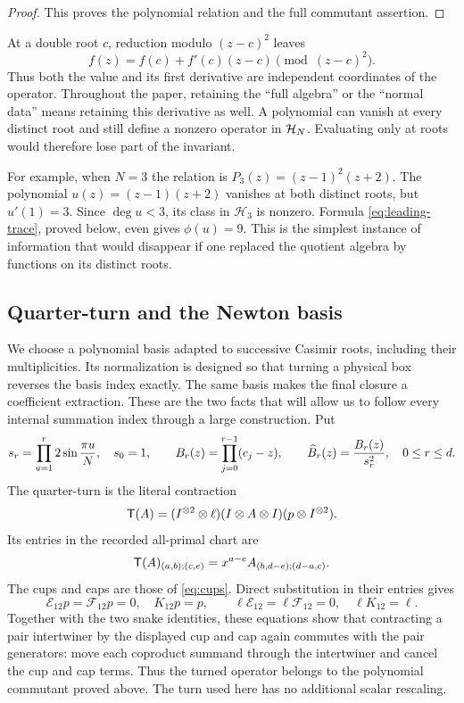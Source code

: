 \begin{proof}
This proves the polynomial relation and the full commutant assertion.

\end{proof}

At a double root $c$, reduction modulo $(z-c)^2$ leaves
\[
 f(z)=f(c)+f'(c)(z-c)\pmod{(z-c)^2}.
\]
Thus both the value and its first derivative are independent coordinates of the operator. Throughout the paper, retaining the ``full algebra'' or the ``normal data'' means retaining this derivative as well. A polynomial can vanish at every distinct root and still define a nonzero operator in $\mathcal H_N$. Evaluating only at roots would therefore lose part of the invariant.

For example, when $N=3$ the relation is
$P_3(z)=(z-1)^2(z+2)$. The polynomial $u(z)=(z-1)(z+2)$
vanishes at both distinct roots, but $u'(1)=3$. Since $\deg u<3$,
its class in $\mathcal H_3$ is nonzero. Formula
\eqref{eq:leading-trace}, proved below, even gives $\phi(u)=9$.
This is the simplest instance of information that would disappear
if one replaced the quotient algebra by functions on its distinct roots.

\subsection{Quarter-turn and the Newton basis}

We choose a polynomial basis adapted to successive Casimir roots, including their multiplicities. Its normalization is designed so that turning a physical box reverses the basis index exactly. The same basis makes the final closure a coefficient extraction. These are the two facts that will allow us to follow every internal summation index through a large construction.
Put
\begin{equation}\label{eq:newton-basis}
 s_r=\prod_{u=1}^{r}2\sin\frac{\pi u}{N},\quad s_0=1,\qquad
 B_r(z)=\prod_{j=0}^{r-1}(c_j-z),\qquad
 \widehat B_r(z)=\frac{B_r(z)}{s_r^2},\quad 0\le r\le d.
\end{equation}
The quarter-turn is the literal contraction
\[
 \mathsf T(A)=(I^{\otimes2}\otimes\ell)(I\otimes A\otimes I)
 (p\otimes I^{\otimes2}).
\]
Its entries in the recorded all-primal chart are
\[
 \mathsf T(A)_{(a,b);(c,e)}=x^{a-e}A_{(b,d-e);(d-a,c)}.
\]
The cups and caps are those of \eqref{eq:cups}. Direct substitution
in their entries gives
\[
 \mathcal E_{12}p=\mathcal F_{12}p=0,\quad K_{12}p=p,
 \qquad
 \ell\mathcal E_{12}=\ell\mathcal F_{12}=0,\quad \ell K_{12}=\ell.
\]
Together with the two snake identities, these equations show that
contracting a pair intertwiner by the displayed cup and cap again
commutes with the pair generators: move each coproduct summand through
the intertwiner and cancel the cup and cap terms. Thus the turned
operator belongs to the polynomial commutant proved above. The turn
used here has no additional scalar rescaling.


